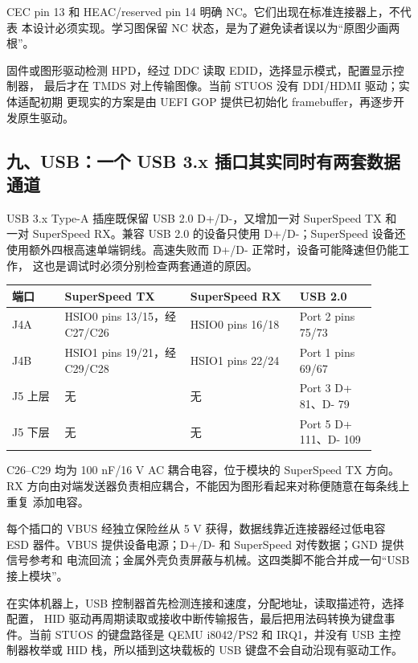 CEC pin 13 和 HEAC/reserved pin 14 明确 NC。它们出现在标准连接器上，不代表
本设计必须实现。学习图保留 NC 状态，是为了避免读者误以为“原图少画两根”。

%
固件或图形驱动检测 HPD，经过 DDC 读取 EDID，选择显示模式，配置显示控制器，
最后才在 TMDS 对上传输图像。当前 STUOS 没有 DDI/HDMI 驱动；实体适配初期
更现实的方案是由 UEFI GOP 提供已初始化 framebuffer，再逐步开发原生驱动。

\subsection{九、USB：一个 USB 3.x 插口其实同时有两套数据通道}


USB 3.x Type-A 插座既保留 USB 2.0 D+/D-，又增加一对 SuperSpeed TX 和
一对 SuperSpeed RX。兼容 USB 2.0 的设备只使用 D+/D-；SuperSpeed 设备还
使用额外四根高速单端铜线。高速失败而 D+/D- 正常时，设备可能降速但仍能工作，
这也是调试时必须分别检查两套通道的原因。

\begin{longtable}{L{0.13\linewidth}L{0.31\linewidth}L{0.27\linewidth}L{0.19\linewidth}}
\toprule
端口 & SuperSpeed TX & SuperSpeed RX & USB 2.0 \\
\midrule
J4A & HSIO0 pins 13/15，经 C27/C26 & HSIO0 pins 16/18 & Port 2 pins 75/73 \\
J4B & HSIO1 pins 19/21，经 C29/C28 & HSIO1 pins 22/24 & Port 1 pins 69/67 \\
J5 上层 & 无 & 无 & Port 3 D+ 81、D- 79 \\
J5 下层 & 无 & 无 & Port 5 D+ 111、D- 109 \\
\bottomrule
\end{longtable}

C26--C29 均为 100 nF/16 V AC 耦合电容，位于模块的 SuperSpeed TX 方向。
RX 方向由对端发送器负责相应耦合，不能因为图形看起来对称便随意在每条线上重复
添加电容。

每个插口的 VBUS 经独立保险丝从 5 V 获得，数据线靠近连接器经过低电容 ESD
器件。VBUS 提供设备电源；D+/D- 和 SuperSpeed 对传数据；GND 提供信号参考和
电流回流；金属外壳负责屏蔽与机械。这四类脚不能合并成一句“USB 接上模块”。

%
在实体机器上，USB 控制器首先检测连接和速度，分配地址，读取描述符，选择配置，
HID 驱动再周期读取或接收中断传输报告，最后把用法码转换为键盘事件。当前
STUOS 的键盘路径是 QEMU i8042/PS2 和 IRQ1，并没有 USB 主控制器枚举或 HID
栈，所以插到这块载板的 USB 键盘不会自动沿现有驱动工作。


